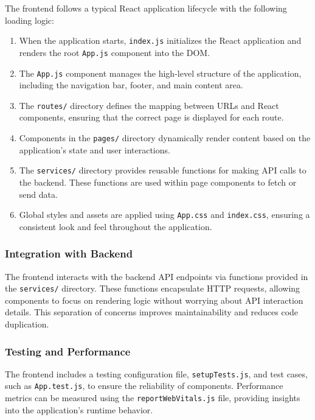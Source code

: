 The frontend follows a typical React application lifecycle with the following loading logic:
\begin{enumerate}
    \item When the application starts, \texttt{index.js} initializes the React application and renders the root \texttt{App.js} component into the DOM.
    \item The \texttt{App.js} component manages the high-level structure of the application, including the navigation bar, footer, and main content area.
    \item The \texttt{routes/} directory defines the mapping between URLs and React components, ensuring that the correct page is displayed for each route.
    \item Components in the \texttt{pages/} directory dynamically render content based on the application's state and user interactions.
    \item The \texttt{services/} directory provides reusable functions for making API calls to the backend. These functions are used within page components to fetch or send data.
    \item Global styles and assets are applied using \texttt{App.css} and \texttt{index.css}, ensuring a consistent look and feel throughout the application.
\end{enumerate}

\subsubsection{Integration with Backend}

The frontend interacts with the backend API endpoints via functions provided in the \texttt{services/} directory. These functions encapsulate HTTP requests, allowing components to focus on rendering logic without worrying about API interaction details. This separation of concerns improves maintainability and reduces code duplication.

\subsubsection{Testing and Performance}

The frontend includes a testing configuration file, \texttt{setupTests.js}, and test cases, such as \texttt{App.test.js}, to ensure the reliability of components. Performance metrics can be measured using the \texttt{reportWebVitals.js} file, providing insights into the application's runtime behavior.

